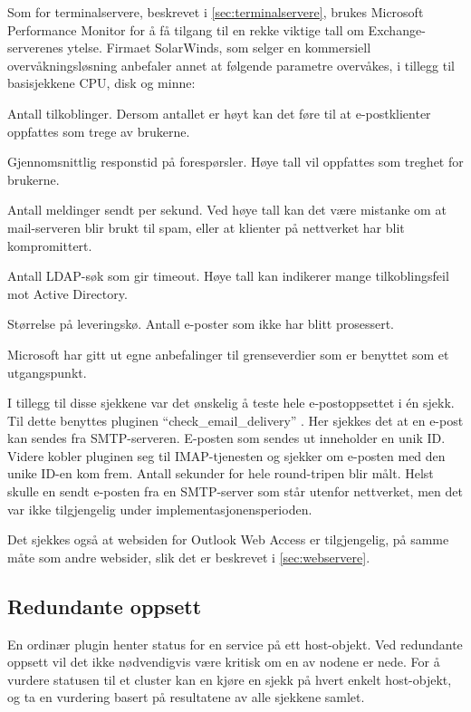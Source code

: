Som for terminalservere, beskrevet i \ref{sec:terminalservere}, brukes Microsoft Performance Monitor for å få tilgang til en rekke viktige tall om Exchange-serverenes ytelse. Firmaet SolarWinds, som selger en kommersiell overvåkningsløsning anbefaler annet at følgende parametre overvåkes\cite{exchange}, i tillegg til basisjekkene CPU, disk og minne:
\begin{itemize*}
	\item Antall tilkoblinger. Dersom antallet er høyt kan det føre til at e-postklienter oppfattes som trege av brukerne.
	\item Gjennomsnittlig responstid på forespørsler. Høye tall vil oppfattes som treghet for brukerne.
	\item Antall meldinger sendt per sekund. Ved høye tall kan det være mistanke om at mail-serveren blir brukt til spam, eller at klienter på nettverket har blit kompromittert.
	\item Antall LDAP-søk som gir timeout. Høye tall kan indikerer mange tilkoblingsfeil mot Active Directory.
	\item Størrelse på leveringskø. Antall e-poster som ikke har blitt prosessert.
\end{itemize*}
Microsoft har gitt ut egne anbefalinger til grenseverdier som er benyttet som et utgangspunkt\cite{exchangethresholds}.

I tillegg til disse sjekkene var det ønskelig å teste hele e-postoppsettet i én sjekk. Til dette benyttes pluginen ``check\_email\_delivery'' \cite{exchange}. Her sjekkes det at en e-post kan sendes fra SMTP-serveren. E-posten som sendes ut inneholder en unik ID. Videre kobler pluginen seg til IMAP-tjenesten og sjekker om e-posten med den unike ID-en kom frem. Antall sekunder for hele round-tripen blir målt. Helst skulle en sendt e-posten fra en SMTP-server som står utenfor nettverket, men det var ikke tilgjengelig under implementasjonensperioden.

Det sjekkes også at websiden for Outlook Web Access er tilgjengelig, på samme måte som andre websider, slik det er beskrevet i \ref{sec:webservere}.

\subsection{Redundante oppsett}
En ordinær plugin henter status for en service på ett host-objekt. Ved redundante oppsett vil det ikke nødvendigvis være kritisk om en av nodene er nede. For å vurdere statusen til et cluster kan en kjøre en sjekk på hvert enkelt host-objekt, og ta en vurdering basert på resultatene av alle sjekkene samlet.


